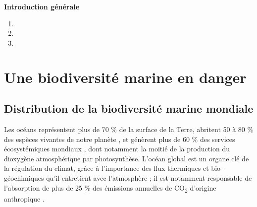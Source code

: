 
\centerline{\bfseries\textcolor{bleusection}{ \Huge Introduction générale}}  

\bigskip



{\LARGE
\begin{enumerate}[label=\textcolor{bleusection}{\arabic*}{.}, leftmargin=2cm]
  \item {}
  \item {}
  \item {}
\end{enumerate}
}

\clearpage
\pagestyle{intro}


\section{Une biodiversité marine en danger}\label{intro.1}

\subsection{Distribution de la biodiversité marine mondiale}\label{intro.1.1}

Les océans représentent plus de 70 \% de la surface de la Terre, abritent 50 à 80 \% des espèces vivantes de notre planète \citep{mora_how_2011, costello_global_2013}, et génèrent plus de 60 \% des services écosystémiques mondiaux \citep{millenium_ecosystem_assessment_ecosystem_2005, bindoff_changing_2019, ipbes_global_2019}, dont notamment la moitié de la production du dioxygène atmosphérique par photosynthèse. L’océan global est un organe clé de la régulation du climat, grâce à l’importance des flux thermiques et bio-géochimiques qu’il entretient avec l’atmosphère ; il est notamment responsable de l’absorption de plus de 25 \% des émissions annuelles de CO\textsubscript{2} d’origine anthropique \citep{heinze_ocean_2015}.

